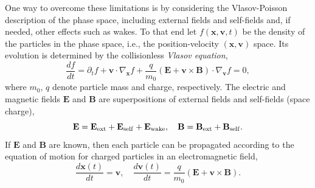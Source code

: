 \documentclass[acus]{JAC2003}
\begin{document}
One way to overcome these limitations is by considering the
Vlasov-Poisson description of the phase space, including external fields and
self-fields and, if needed, other effects such as wakes.  To that end
let $f(\mathbf{x},\mathbf{v},t)$ be the density of the particles in the
phase space, i.e., the position-velocity $(\mathbf{x}, \mathbf{v})$
space.  Its evolution is determined by the collisionless \emph{Vlasov
  equation},
\begin{equation}\label{eq:Vlasov}
  \frac{df}{dt}=\partial_t f + \mathbf{v} \cdot \nabla_{\mathbf{x}} f
  +\frac{q}{m_0}(\mathbf{E}+ \mathbf{v}\times\mathbf{B})\cdot
  \nabla_{\mathbf{v}} f  =  0,
\end{equation}
where $m_0$, $q$ denote particle mass and charge, respectively.  The
electric and magnetic fields $\mathbf{E}$ and $\mathbf{B}$ are
superpositions of external fields and self-fields (space charge),
\begin{equation}\label{eq:allfield}
    \mathbf{E} =
    \mathbf{E_{\RM{ext}}} + \mathbf{E_{\RM{self}}}  + \mathbf{E_{\RM{wake}}}, \quad
    \mathbf{B} =
    \mathbf{B_{\RM{ext}}} + \mathbf{B_{\RM{self}}}.
\end{equation}
If $\mathbf{E}$ and $\mathbf{B}$ are known, then each particle can be
propagated according to the equation of motion for charged particles in an
electromagnetic field,
\begin{equation*}\label{eq:motion}
  \frac{d\mathbf{x}(t)}{dt}  = \mathbf{v},
  \quad
  \frac{d\mathbf{v}(t)}{dt}  = \frac{q}{m_0}\left(\mathbf{E} +
    \mathbf{v}\times \mathbf{B}\right).
\end{equation*}
\end{document}
